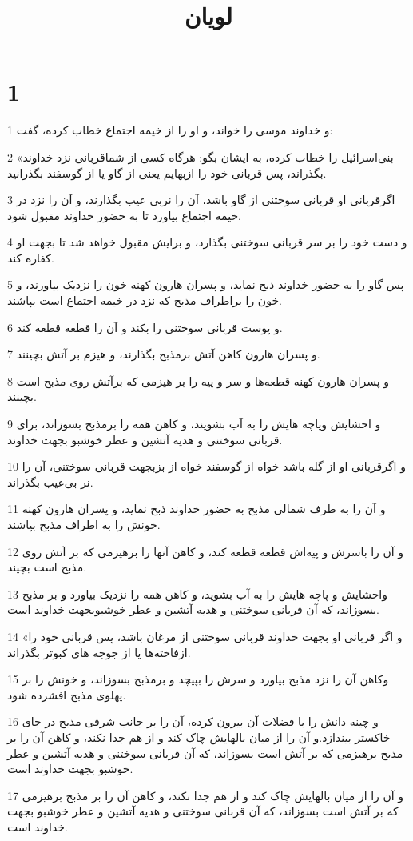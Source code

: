 

\title{لويان}

 
\chapter{1}

\par 1 و خداوند موسی را خواند، و او را از خیمه اجتماع خطاب کرده، گفت:
\par 2 «بنی‌اسرائیل را خطاب کرده، به ایشان بگو: هرگاه کسی از شماقربانی نزد خداوند بگذراند، پس قربانی خود را ازبهایم یعنی از گاو یا از گوسفند بگذرانید.
\par 3 اگرقربانی او قربانی سوختنی از گاو باشد، آن را نربی عیب بگذارند، و آن را نزد در خیمه اجتماع بیاورد تا به حضور خداوند مقبول شود.
\par 4 و دست خود را بر سر قربانی سوختنی بگذارد، و برایش مقبول خواهد شد تا بجهت او کفاره کند.
\par 5 پس گاو را به حضور خداوند ذبح نماید، و پسران هارون کهنه خون را نزدیک بیاورند، و خون را براطراف مذبح که نزد در خیمه اجتماع است بپاشند.
\par 6 و پوست قربانی سوختنی را بکند و آن را قطعه قطعه کند.
\par 7 و پسران هارون کاهن آتش برمذبح بگذارند، و هیزم بر آتش بچینند.
\par 8 و پسران هارون کهنه قطعه‌ها و سر و پیه را بر هیزمی که برآتش روی مذبح است بچینند.
\par 9 و احشایش وپاچه هایش را به آب بشویند، و کاهن همه را برمذبح بسوزاند، برای قربانی سوختنی و هدیه آتشین و عطر خوشبو بجهت خداوند.
\par 10 و اگرقربانی او از گله باشد خواه از گوسفند خواه از بزبجهت قربانی سوختنی، آن را نر بی‌عیب بگذراند.
\par 11 و آن را به طرف شمالی مذبح به حضور خداوند ذبح نماید، و پسران هارون کهنه خونش را به اطراف مذبح بپاشند.
\par 12 و آن را باسرش و پیه‌اش قطعه قطعه کند، و کاهن آنها را برهیزمی که بر آتش روی مذبح است بچیند.
\par 13 واحشایش و پاچه هایش را به آب بشوید، و کاهن همه را نزدیک بیاورد و بر مذبح بسوزاند، که آن قربانی سوختنی و هدیه آتشین و عطر خوشبوبجهت خداوند است.
\par 14 «و اگر قربانی او بجهت خداوند قربانی سوختنی از مرغان باشد، پس قربانی خود را ازفاخته‌ها یا از جوجه های کبوتر بگذراند.
\par 15 وکاهن آن را نزد مذبح بیاورد و سرش را بپیچد و برمذبح بسوزاند، و خونش را بر پهلوی مذبح افشرده شود.
\par 16 و چینه دانش را با فضلات آن بیرون کرده، آن را بر جانب شرقی مذبح در جای خاکستر بیندازد.و آن را از میان بالهایش چاک کند و از هم جدا نکند، و کاهن آن را بر مذبح برهیزمی که بر آتش است بسوزاند، که آن قربانی سوختنی و هدیه آتشین و عطر خوشبو بجهت خداوند است.
\par 17 و آن را از میان بالهایش چاک کند و از هم جدا نکند، و کاهن آن را بر مذبح برهیزمی که بر آتش است بسوزاند، که آن قربانی سوختنی و هدیه آتشین و عطر خوشبو بجهت خداوند است.
 
